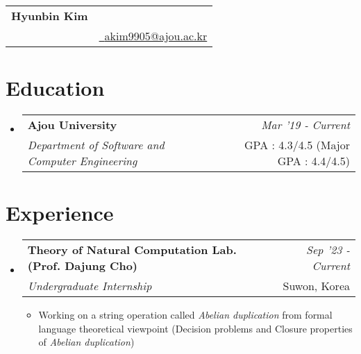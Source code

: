 \documentclass[a4paper,11pt]{article}
\makeatletter
\newcommand{\resumeSubheading}[4]{
\vspace{0.5mm}\item
    \begin{tabular*}{0.98\textwidth}[t]{l@{\extracolsep{\fill}}r}
        \textbf{#1} & \textit{\footnotesize{#4}} \\
        \textit{\footnotesize{#3}} &  \footnotesize{#2}\\
    \end{tabular*}
    \vspace{-2.4mm}
}
\newcommand{\resumeSubHeadingListStart}{\begin{itemize}[leftmargin=*,labelsep=0mm]}
\newcommand{\resumeItemListStart}{\begin{justify}\begin{itemize}[leftmargin=3ex, rightmargin=2ex, noitemsep,labelsep=1.2mm,itemsep=0mm]\small}
\newcommand{\resumeSubHeadingListEnd}{\end{itemize}\vspace{2mm}}
\newcommand{\resumeItemListEnd}{\end{itemize}\end{justify}\vspace{-2mm}}
\newcommand{\name}{Hyunbin Kim} %
\newcommand{\course}{ } %
\newcommand{\emailb}{akim9905@ajou.ac.kr} %
\makeatother
\begin{document}
\selectfont


\parbox{\dimexpr\linewidth\relax}{
\begin{tabularx}{\linewidth}{L r} \\
  \textbf{\huge \name} & {\raisebox{0.0\height}{\footnotesize}\ }\\
  \course &  \href{mailto:\emailb}{\raisebox{0.0\height}{\footnotesize \faEnvelope}\ {\emailb}} \\
\end{tabularx}
}





\section{\textbf{Education}}
  \resumeSubHeadingListStart
    \resumeSubheading
      {Ajou University}{GPA : 4.3/4.5 (Major GPA : 4.4/4.5)}
      {Department of Software and Computer Engineering}{Mar '19 - Current}
  \resumeSubHeadingListEnd
%



\section{\textbf{Experience}}
  \resumeSubHeadingListStart
    \resumeSubheading
      {Theory of Natural Computation Lab. (Prof. Dajung Cho)}{Suwon, Korea}
      {Undergraduate Internship}{Sep '23 - Current}
      \resumeItemListStart
    \item {Working on a string operation called \textit{Abelian duplication} from formal language theoretical viewpoint (Decision problems and Closure properties of \textit{Abelian duplication})}
    \resumeItemListEnd    
  \resumeSubHeadingListEnd
\end{document}
